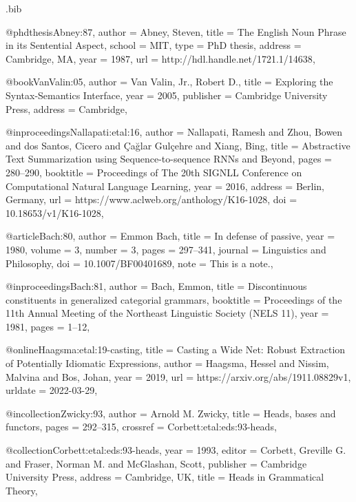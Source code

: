 \begin{filecontents}[overwrite]{\jobname.bib}

@phdthesis{Abney:87,
  author = {Abney, Steven},
  title = {The {English} Noun Phrase in its Sentential Aspect},
  school = {MIT},
  type = {PhD thesis},
  address = {Cambridge, MA},
  year = {1987},
  url = {http://hdl.handle.net/1721.1/14638},
}

@book{VanValin:05,
  author = {Van Valin, Jr., Robert D.},
  title = {Exploring the Syntax-Semantics Interface},
  year = {2005},
  publisher = {Cambridge University Press},
  address = {Cambridge},
}

@inproceedings{Nallapati:etal:16,
  author = {Nallapati, Ramesh and Zhou, Bowen and dos Santos, Cicero and  Çağlar Gulçehre and Xiang, Bing},
  title = {Abstractive Text Summarization using Sequence-to-sequence {RNN}s and Beyond},
  pages = {280--290},
  booktitle = {Proceedings of The 20th {SIGNLL} Conference on Computational Natural Language Learning},
  year = {2016},
  address = {Berlin, Germany},
  url = {https://www.aclweb.org/anthology/K16-1028},
  doi = {10.18653/v1/K16-1028},
}

@article{Bach:80,
  author = {Emmon Bach},
  title = {In defense of passive},
  year = {1980},
  volume = {3},
  number = {3},
  pages = {297--341},
  journal = {Linguistics and Philosophy},
  doi = {10.1007/BF00401689},
  note = {This is a note.},
}

@inproceedings{Bach:81,
  author = {Bach, Emmon},
  title = {Discontinuous constituents in generalized categorial grammars},
  booktitle = {Proceedings of the 11th Annual Meeting of the Northeast Linguistic Society (NELS 11)},
  year = {1981},
  pages = {1--12},
}

@online{Haagsma:etal:19-casting,
  title = {Casting a Wide Net: {Robust} Extraction of Potentially Idiomatic Expressions},
  author = {Haagsma, Hessel and Nissim, Malvina and Bos, Johan},
  year = {2019},
  url = {https://arxiv.org/abs/1911.08829v1},
  urldate = {2022-03-29},
}

@incollection{Zwicky:93,
  author = {Arnold M. Zwicky},
  title = {Heads, bases and functors},
  pages = {292--315},
  crossref = {Corbett:etal:eds:93-heads},
}

@collection{Corbett:etal:eds:93-heads,
  year = {1993},
  editor = {Corbett, Greville G. and Fraser, Norman M. and McGlashan, Scott},
  publisher = {Cambridge University Press},
  address = {Cambridge, UK},
  title = {Heads in Grammatical Theory},
} 


\end{filecontents}
